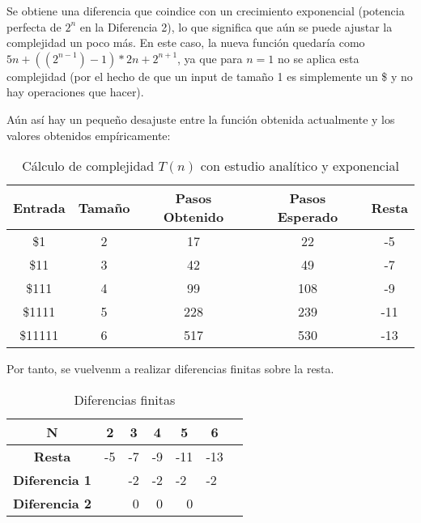 \documentclass{uc3mpracticas}
\begin{document}
    Se obtiene una diferencia que coindice con un crecimiento exponencial (potencia perfecta de $2^n$ en la Diferencia 2), lo que significa que aún se puede ajustar la complejidad un poco más. En este caso, la nueva función quedaría como $5n + ((2^{n-1}) - 1) * 2n + 2^{n+1}$, ya que para $n = 1$ no se aplica esta complejidad (por el hecho de que un input de tamaño 1 es simplemente un \$ y no hay operaciones que hacer).

    \vspace{2mm}

    Aún así hay un pequeño desajuste entre la función obtenida actualmente y los valores obtenidos empíricamente:

    \begin{table}[!h]
      \centering
    \begin{tabular}{|c|c|c|c|c|}
    \hline
    \textbf{Entrada} & \textbf{Tamaño} & \textbf{Pasos Obtenido} & \textbf{Pasos Esperado} & \textbf{Resta}\\ \hline
    \$1              & 2               & 17                      & 22                        & -5             \\ \hline
    \$11             & 3               & 42                      & 49                        &  -7             \\ \hline
    \$111            & 4               & 99                      & 108                        &  -9             \\ \hline
    \$1111           & 5               & 228                     & 239                       &  -11           \\ \hline
    \$11111          & 6               & 517                     & 530                       &  -13         \\ \hline
    \end{tabular}
    \caption{Cálculo de complejidad $T(n)$ con estudio analítico y exponencial}
    \end{table}

    Por tanto, se vuelvenm a realizar diferencias finitas sobre la resta.

    \begin{table}[!h]
      \centering
    \begin{tabular}{|c|p{1cm}|p{1cm}|p{1cm}|p{1cm}|p{1cm}|p{1cm}|}
    \hline
    \textbf{N}     & \multicolumn{1}{c|}{\textbf{2}} & \multicolumn{1}{c|}{\textbf{3}} & \multicolumn{1}{c|}{\textbf{4}} & \multicolumn{1}{c|}{\textbf{5}} & \multicolumn{1}{c|}{\textbf{6}} \\ \hline
    \textbf{Resta} & \multicolumn{1}{c|}{-5}& \multicolumn{1}{c|}{-7}& \multicolumn{1}{c|}{-9}& \multicolumn{1}{c|}{-11}& \multicolumn{1}{c|}{-13} \\ \hline
    \textbf{Diferencia 1}& & -2& -2& -2& -2\\ \hline
    \textbf{Diferencia 2} & &\multicolumn{1}{r|}{0} &\multicolumn{1}{r|}{0} &\multicolumn{1}{r|}{0} & \\ \hline
    \end{tabular}
    \caption{Diferencias finitas}
    \end{table}
\end{document}
